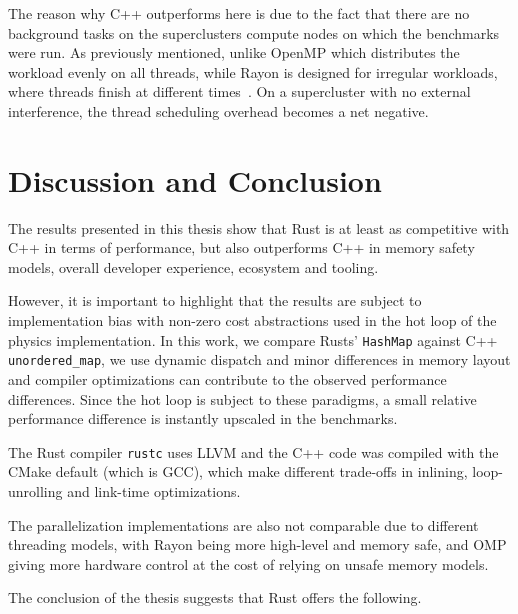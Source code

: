 \documentclass[11pt,
               a4paper,
               bibtotoc,
               idxtotoc,
               headsepline,
               footsepline,
               footexclude,
               BCOR12mm,
               DIV13,
               openany,   %
               ]
               {scrbook}
\begin{document}
The reason why C++ outperforms here is due to the fact that there are no background tasks on the superclusters compute nodes on which the benchmarks were run. As previously mentioned, unlike OpenMP which distributes the workload evenly on all threads, while Rayon is designed for irregular workloads, where threads finish at different times~\cite{rust-rayon-work-stealing}. On a supercluster with no external interference, the thread scheduling overhead becomes a net negative.


\chapter{Discussion and Conclusion}

The results presented in this thesis show that Rust is at least as competitive with C++ in terms of performance, but also outperforms C++ in memory safety models, overall developer experience, ecosystem and tooling.

However, it is important to highlight that the results are subject to implementation bias with non-zero cost abstractions used in the hot loop of the physics implementation. In this work, we compare Rusts' \texttt{HashMap} against C++ \texttt{unordered\_map}, we use dynamic dispatch and minor differences in memory layout and compiler optimizations can contribute to the observed performance differences. Since the hot loop is subject to these paradigms, a small relative performance difference is instantly upscaled in the benchmarks.

The Rust compiler \texttt{rustc} uses LLVM and the C++ code was compiled with the CMake default (which is GCC), which make different trade-offs in inlining, loop-unrolling and link-time optimizations.

The parallelization implementations are also not comparable due to different threading models, with Rayon being more high-level and memory safe, and OMP giving more hardware control at the cost of relying on unsafe memory models.

The conclusion of the thesis suggests that Rust offers the following.
\end{document}
